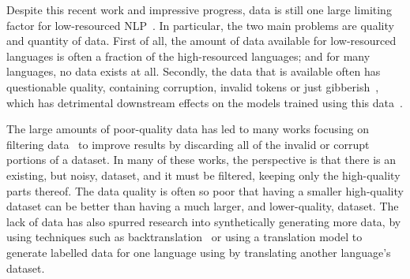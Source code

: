 \documentclass{article}
\begin{document}

Despite this recent work and impressive progress, data is still one large limiting factor for low-resourced NLP~\citep{adelani2022Thousand,adelani2022Masakhaner}. In particular, the two main problems are quality and quantity of data. First of all, the amount of data available for low-resourced languages is often a fraction of the high-resourced languages; and for many languages, no data exists at all. Secondly, the data that is available often has questionable quality, containing corruption, invalid tokens or just gibberish~\citep{kreutzer2021Quality}, which has detrimental downstream effects on the models trained using this data~\citep{abdul2012Extrinsic,alabi2019Massive}.




The large amounts of poor-quality data has led to many works focusing on filtering data~\citep{axelrod2011Domain,xu2019Improving,imankulova2017Improving,abdulmumin-hybrid-2021,abdulmumin2022Separating} to improve results by discarding all of the invalid or corrupt portions of a dataset. In many of these works, the perspective is that there is an existing, but noisy, dataset, and it must be filtered, keeping only the high-quality parts thereof. The data quality is often so poor that having a smaller high-quality dataset can be better than having a much larger, and lower-quality, dataset. The lack of data has also spurred research into synthetically generating more data, by using techniques such as backtranslation~\citep{bojar2011Improving,lambert2011Investigations,sennrich2015Improving} or using a translation model to generate labelled data for one language using by translating another language's dataset.
\end{document}
